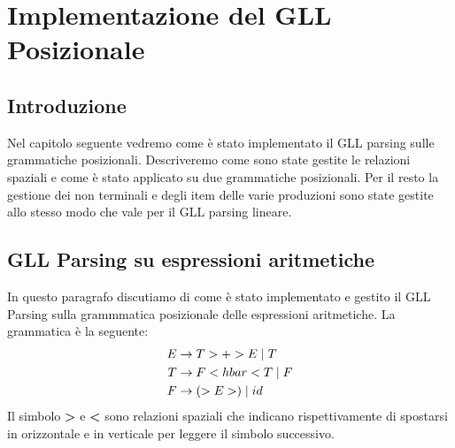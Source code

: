 \chapter{Implementazione del GLL Posizionale}
\section{Introduzione}
Nel capitolo seguente vedremo come è stato implementato il GLL parsing sulle grammatiche posizionali. Descriveremo come sono state gestite le relazioni spaziali e come è stato applicato su due grammatiche posizionali. Per il resto la gestione dei non terminali e degli item delle varie produzioni sono state gestite allo stesso modo che vale per il GLL parsing lineare.
\section{GLL Parsing su espressioni aritmetiche}
In questo paragrafo discutiamo di come è stato implementato e gestito il GLL Parsing sulla grammmatica posizionale delle espressioni aritmetiche. La grammatica è la seguente:
\begin{align}\label{gramPos1}
E & \to T > + > E \mid  T \notag \\
T & \to F < hbar < T \mid F \notag \\
F & \to ( > E > ) \mid id 
\end{align}
Il simbolo \textbf{>} e \textbf{<} sono relazioni spaziali che indicano rispettivamente di spostarsi in orizzontale e in verticale per leggere il simbolo successivo.
